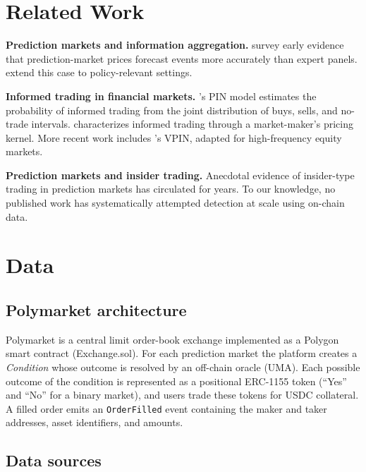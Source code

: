\documentclass[11pt]{article}
\begin{document}
\section{Related Work}
\label{sec:related}

\textbf{Prediction markets and information aggregation.}
\citet{wolfers2004prediction} survey early evidence that prediction-market
prices forecast events more accurately than expert panels.
\citet{arrow2008promise} extend this case to policy-relevant settings.

\textbf{Informed trading in financial markets.}
\citet{easley1996liquidity}'s PIN model estimates the probability of
informed trading from the joint distribution of buys, sells, and no-trade
intervals. \citet{kyle1985continuous} characterizes informed trading
through a market-maker's pricing kernel. More recent work includes
\citet{easley2012volume}'s VPIN, adapted for high-frequency equity markets.

\textbf{Prediction markets and insider trading.}
Anecdotal evidence of insider-type trading in prediction markets has
circulated for years. To our knowledge, no published work has systematically
attempted detection at scale using on-chain data.

\section{Data}
\label{sec:data}

\subsection{Polymarket architecture}

Polymarket is a central limit order-book exchange implemented as a
Polygon smart contract (Exchange.sol). For each prediction market the
platform creates a \textit{Condition} whose outcome is resolved by an
off-chain oracle (UMA). Each possible outcome of the condition is
represented as a positional ERC-1155 token (``Yes'' and ``No'' for a
binary market), and users trade these tokens for USDC collateral. A
filled order emits an \texttt{OrderFilled} event containing the maker
and taker addresses, asset identifiers, and amounts.

\subsection{Data sources}
\end{document}
